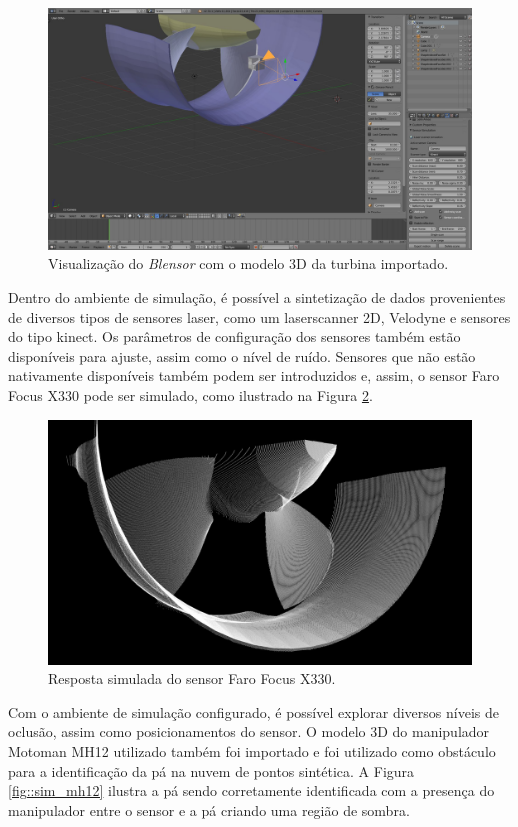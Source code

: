 \begin{figure}[h!]
	\centering
	\includegraphics[width=0.9\columnwidth]{figs/calibracao/blensor_screen}
	\caption{Visualização do \textit{Blensor} com o modelo 3D da turbina
	importado.}
    \label{fig::blensor_screen}
\end{figure}

Dentro do ambiente de simulação, é possível a sintetização de dados provenientes
de diversos tipos de sensores laser, como um laserscanner 2D, Velodyne e
sensores do tipo kinect. Os parâmetros de configuração dos sensores também estão
disponíveis para ajuste, assim como o nível de ruído. Sensores que não estão
nativamente disponíveis também podem ser introduzidos e, assim, o sensor Faro
Focus X330 pode ser simulado, como ilustrado na Figura \ref{fig::blensor_faro}.

\begin{figure}[H]
	\centering
	\includegraphics[width=0.9\columnwidth]{figs/calibracao/blensor_faro}
	\caption{Resposta simulada do sensor Faro Focus X330.}
    \label{fig::blensor_faro}
\end{figure}	


Com o ambiente de simulação configurado, é possível explorar diversos níveis de
oclusão, assim como posicionamentos do sensor. O modelo 3D do manipulador
Motoman MH12 utilizado também foi importado e foi utilizado como obstáculo para
a identificação da pá na nuvem de pontos sintética. A Figura \ref{fig::sim_mh12}
ilustra a pá sendo corretamente identificada com a presença do manipulador entre
o sensor e a pá criando uma região de sombra.

